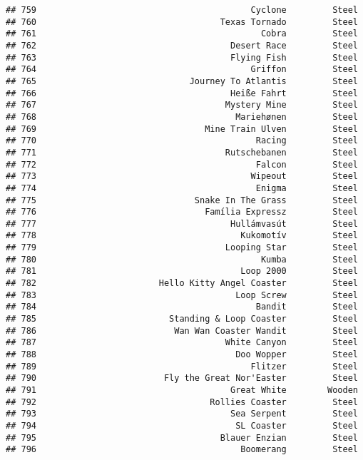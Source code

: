 \documentclass[
]{article}
\begin{document}
\begin{verbatim}
## 759                                          Cyclone         Steel
## 760                                    Texas Tornado         Steel
## 761                                            Cobra         Steel
## 762                                      Desert Race         Steel
## 763                                      Flying Fish         Steel
## 764                                          Griffon         Steel
## 765                              Journey To Atlantis         Steel
## 766                                      Heiße Fahrt         Steel
## 767                                     Mystery Mine         Steel
## 768                                       Mariehønen         Steel
## 769                                 Mine Train Ulven         Steel
## 770                                           Racing         Steel
## 771                                     Rutschebanen         Steel
## 772                                           Falcon         Steel
## 773                                          Wipeout         Steel
## 774                                           Enigma         Steel
## 775                               Snake In The Grass         Steel
## 776                                 Família Expressz         Steel
## 777                                      Hullámvasút         Steel
## 778                                        Kukomotív         Steel
## 779                                     Looping Star         Steel
## 780                                            Kumba         Steel
## 781                                        Loop 2000         Steel
## 782                        Hello Kitty Angel Coaster         Steel
## 783                                       Loop Screw         Steel
## 784                                           Bandit         Steel
## 785                          Standing & Loop Coaster         Steel
## 786                           Wan Wan Coaster Wandit         Steel
## 787                                     White Canyon         Steel
## 788                                       Doo Wopper         Steel
## 789                                          Flitzer         Steel
## 790                         Fly the Great Nor'Easter         Steel
## 791                                      Great White        Wooden
## 792                                  Rollies Coaster         Steel
## 793                                      Sea Serpent         Steel
## 794                                       SL Coaster         Steel
## 795                                    Blauer Enzian         Steel
## 796                                        Boomerang         Steel

\end{verbatim}
\end{document}
